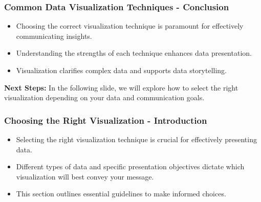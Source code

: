 \documentclass[aspectratio=169]{beamer}
\begin{document}
\begin{frame}[fragile]
    \frametitle{Common Data Visualization Techniques - Conclusion}
    \begin{itemize}
        \item Choosing the correct visualization technique is paramount for effectively communicating insights.
        \item Understanding the strengths of each technique enhances data presentation.
        \item Visualization clarifies complex data and supports data storytelling.
    \end{itemize}
    
    \textbf{Next Steps:} In the following slide, we will explore how to select the right visualization depending on your data and communication goals.
\end{frame}

\begin{frame}[fragile]
    \frametitle{Choosing the Right Visualization - Introduction}
    \begin{itemize}
        \item Selecting the right visualization technique is crucial for effectively presenting data. 
        \item Different types of data and specific presentation objectives dictate which visualization will best convey your message.
        \item This section outlines essential guidelines to make informed choices.
    \end{itemize}
\end{frame}
\end{document}
